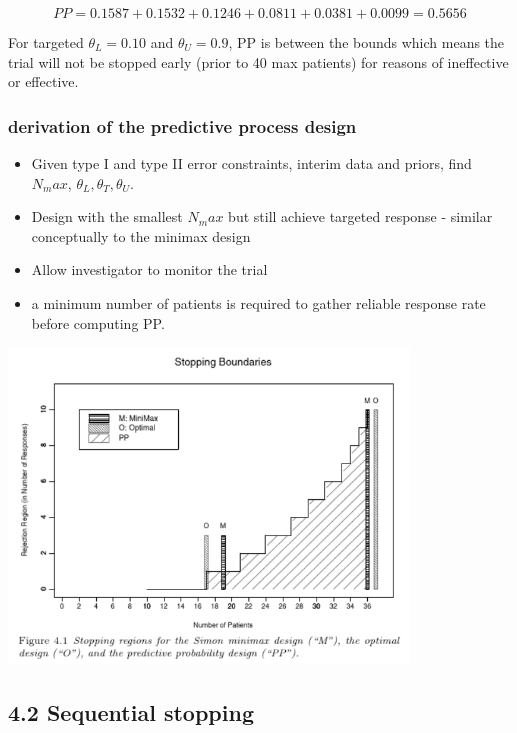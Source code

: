 \documentclass[
]{article}
\begin{document}
\[PP=0.1587+0.1532+0.1246+0.0811+0.0381+0.0099=0.5656\]

For targeted \(\theta_L=0.10\) and \(\theta_U=0.9\), PP is between the
bounds which means the trial will not be stopped early (prior to 40 max
patients) for reasons of ineffective or effective.

\hypertarget{derivation-of-the-predictive-process-design}{%
\subsubsection{derivation of the predictive process
design}\label{derivation-of-the-predictive-process-design}}

\begin{itemize}
\item
  Given type I and type II error constraints, interim data and priors,
  find \(N_max\), \(\theta_L, \theta_T, \theta_U\).
\item
  Design with the smallest \(N_max\) but still achieve targeted response
  - similar conceptually to the minimax design
\item
  Allow investigator to monitor the trial
\item
  a minimum number of patients is required to gather reliable response
  rate before computing PP.
\end{itemize}

\includegraphics[width=0.8\textwidth,height=\textheight]{Figure4.1.PNG}

\hypertarget{sequential-stopping}{%
\subsection{4.2 Sequential stopping}\label{sequential-stopping}}
\end{document}
